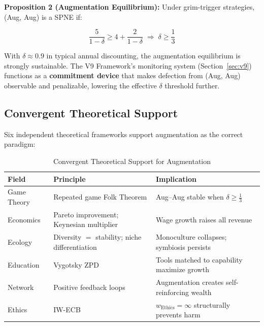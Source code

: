 \documentclass[conference]{IEEEtran}
\begin{document}
\textbf{Proposition 2 (Augmentation Equilibrium):}
Under grim-trigger strategies, (Aug, Aug) is a SPNE if:

\begin{equation}
  \frac{5}{1-\delta} \geq 4 + \frac{2}{1-\delta}
  \;\Rightarrow\; \delta \geq \frac{1}{3}
  \label{eq:equilibrium}
\end{equation}

With $\delta \approx 0.9$ in typical annual discounting,
the augmentation equilibrium is strongly sustainable.
The V9 Framework's monitoring system (Section~\ref{sec:v9})
functions as a \textbf{commitment device} that makes
defection from (Aug, Aug) observable and penalizable,
lowering the effective $\delta$ threshold further.

\subsection{Convergent Theoretical Support}

Six independent theoretical frameworks support
augmentation as the correct paradigm:

\begin{table}[!ht]
\caption{Convergent Theoretical Support for Augmentation}
\label{tab:theory}
\centering
\renewcommand{\arraystretch}{1.15}
\begin{tabular}{p{1.4cm}p{3.2cm}p{2.6cm}}
\toprule
\textbf{Field} & \textbf{Principle} & \textbf{Implication} \\
\midrule
Game Theory
  & Repeated game Folk Theorem
  & Aug--Aug stable when $\delta\geq\frac{1}{3}$ \\
Economics
  & Pareto improvement; Keynesian multiplier
  & Wage growth raises all revenue \\
Ecology
  & Diversity $=$ stability; niche differentiation
  & Monoculture collapses; symbiosis persists \\
Education
  & Vygotsky ZPD
  & Tools matched to capability maximize growth \\
Network
  & Positive feedback loops
  & Augmentation creates self-reinforcing wealth \\
Ethics
  & IW-ECB~\cite{iwecb2026}
  & $w_{\text{Ethics}}=\infty$ structurally prevents harm \\
\bottomrule
\end{tabular}
\end{table}

\end{document}
